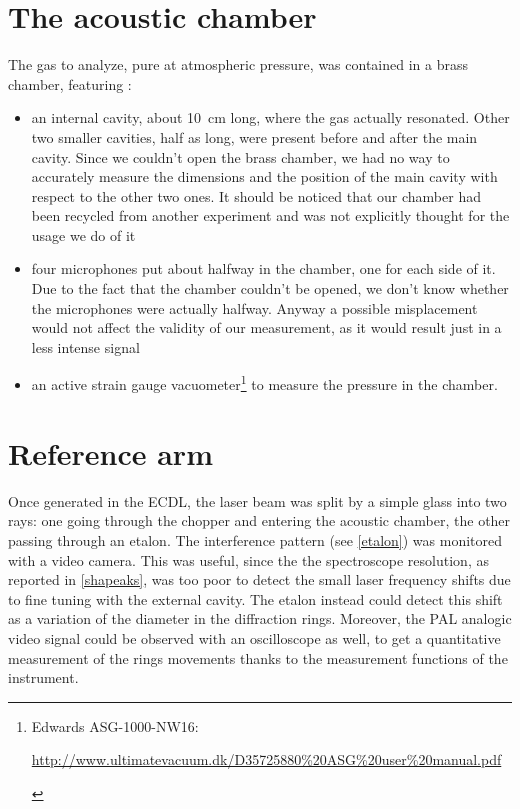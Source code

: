 \section{The acoustic chamber} 
 The gas to analyze, pure  at atmospheric pressure, was contained in a brass chamber, featuring :
\begin{itemize}
	\item an internal cavity, about \mbox{10 cm} long, where the gas actually resonated. Other two smaller cavities, half as long, were present before and after the main cavity. Since we couldn't open the brass chamber, we had no way to accurately measure the dimensions and the position of the main cavity with respect to the other two ones. It should be noticed that our chamber had been recycled from another experiment and was not explicitly thought for the usage we do of it
	\item four microphones put about halfway in the chamber, one for each side of it. Due to the fact that the chamber couldn't be opened, we don't know whether the microphones were actually halfway. Anyway a possible misplacement would not affect the validity of our measurement, as it would result just in a less intense signal
	\item an active strain gauge vacuometer\footnote{Edwards ASG-1000-NW16:\vspace{-10pt}\begin{flushright}\url{http://www.ultimatevacuum.dk/D35725880\%20ASG\%20user\%20manual.pdf }\end{flushright}} to measure the pressure in the chamber. 
\end{itemize}

\section{Reference arm}\label{referencearm}
Once generated in the ECDL, the laser beam was split by a simple glass into two rays: one going through the chopper and entering the acoustic chamber, the other passing  through an etalon. The interference pattern (see \cref{etalon}) was monitored with a video camera. This was useful, since the the spectroscope resolution, as reported in \cref{shapeaks}, was too poor to detect the small laser frequency shifts due to fine tuning with the external cavity. The etalon instead could detect this shift as a variation of the diameter in the diffraction rings. Moreover, the PAL analogic video signal could be observed with an oscilloscope as well, to get a quantitative measurement of the rings movements thanks to the measurement functions of the instrument.